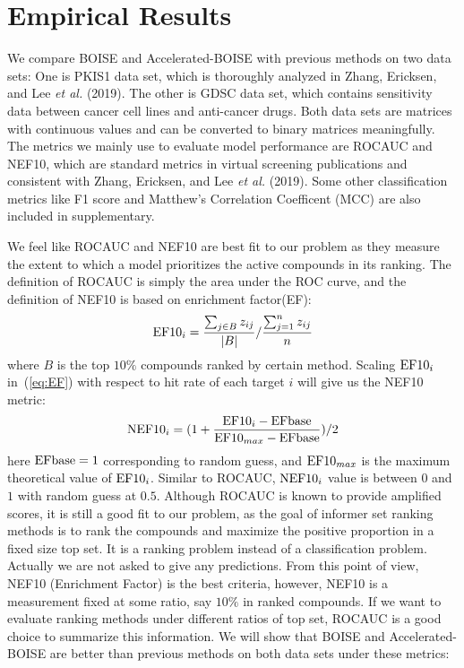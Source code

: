 \documentclass[12pt]{article}
\begin{document}
\section{Empirical Results}
We compare BOISE and Accelerated-BOISE with previous methods on two data sets: One is PKIS1 data set, which is thoroughly analyzed in  Zhang, Ericksen, and Lee {\em et al.} (2019). The other is GDSC data set, which contains sensitivity data between cancer cell lines and anti-cancer drugs. Both data sets are matrices with continuous values and can be converted to binary matrices meaningfully. The metrics we mainly use to evaluate model performance are ROCAUC and NEF10, which are standard metrics in virtual screening publications and consistent with Zhang, Ericksen, and Lee {\em et al.} (2019). Some other  classification metrics like F1 score and Matthew's Correlation Coefficent (MCC) are also included in supplementary. 

We feel like ROCAUC and NEF10 are best fit to our problem as they measure the extent to which a model prioritizes the active compounds in its ranking. The definition of ROCAUC is simply the area under the ROC curve, and the definition of NEF10 is based on enrichment factor(EF):
\begin{eqnarray}
\label{eq:EF}
{\rm EF10}_i = \frac{\sum_{j\in B}z_{ij}}{|B|}/\frac{\sum_{j=1}^nz_{ij}}{n}
\end{eqnarray}
where $B$ is the top $10\%$ compounds ranked by certain method. Scaling ${\rm EF10}_i$ in~(\ref{eq:EF}) with respect to hit rate of each target $i$ will give us the NEF10 metric:
\begin{eqnarray}
\label{eq:NEF}
{\rm NEF10}_i = (1+\frac{{\rm EF10}_i - {\rm EFbase}}{{\rm EF10}_{max} -{\rm EFbase} })/2
\end{eqnarray}
here ${\rm EFbase} = 1$ corresponding to random guess, and ${\rm EF10}_{max}$ is the maximum theoretical value of ${\rm EF10}_i$. Similar to ROCAUC, ${\rm NEF10}_i$ value is between $0$ and $1$ with random guess at $0.5$. 
Although ROCAUC is known to provide amplified scores, it is still a good fit to our problem, as the goal of informer set ranking methods is to rank the compounds and maximize the positive proportion in a fixed size top set. It is a ranking problem instead of a classification problem. Actually we are not asked to give any predictions. From this point of view, NEF10 (Enrichment Factor) is the best criteria, however, NEF10 is a measurement fixed at some ratio, say $10\%$ in ranked compounds. If we want to evaluate ranking methods under different ratios of top set, ROCAUC is a good choice to summarize this information. We will show that BOISE and Accelerated-BOISE are better than previous methods on both data sets under these metrics:
\end{document}
